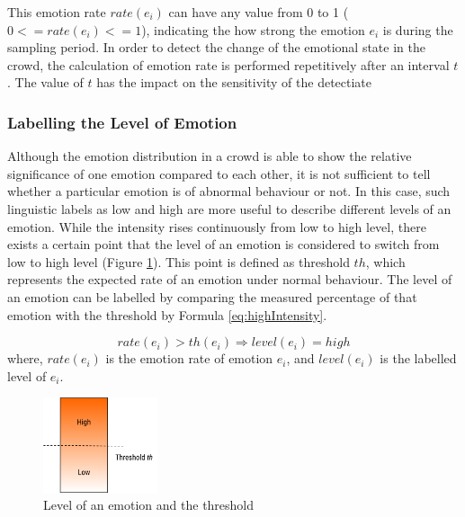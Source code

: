 This emotion rate \(rate(e_i)\) can have any value from 0 to 1 (\(0 <= rate(e_i) <= 1\)), indicating the how strong the emotion \(e_i\) is during the sampling period. In order to detect the change of the emotional state in the crowd, the calculation of emotion rate is performed repetitively after an interval \(t\). The value of \(t\) has the impact on the sensitivity of the detectiate

\subsubsection{Labelling the Level of Emotion}
Although the emotion distribution in a crowd is able to show the relative significance of one emotion compared to each other, it is not sufficient to tell whether a particular emotion is of abnormal behaviour or not. In this case, such linguistic labels as low and high are more useful to describe different levels of an emotion. While the intensity rises continuously from low to high level, there exists a certain point that the level of an emotion is considered to switch from low to high level (Figure \ref{fig:levelOfDensity}). This point is defined as threshold \(th\), which represents the expected rate of an emotion under normal behaviour. The level of an emotion can be labelled by comparing the measured percentage of that emotion with the threshold by Formula \ref{eq:highIntensity}.

\begin{equation}
\label{eq:highIntensity}
	rate(e_i) > th(e_i) \Rightarrow level(e_i) = high
\end{equation}
where, \(rate(e_i)\) is the emotion rate of emotion \(e_i\), and \(level(e_i)\) is the labelled level of \(e_i\).

\begin{figure}[htb!] 
\centering    
\includegraphics[width=0.3\textwidth]{LevelOfEmotion}
\caption{Level of an emotion and the threshold}
\label{fig:levelOfDensity}
\end{figure}

